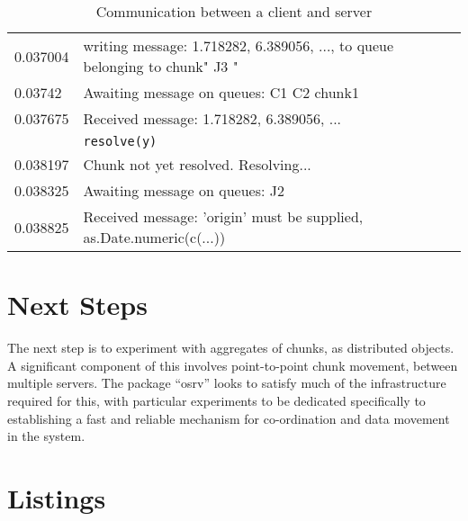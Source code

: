 \documentclass[a4paper,10pt]{article}
\begin{document}
\begin{table}
\begin{tabularx}{\textwidth}{lX}
		0.037004 & \textcolor{\servercolour}{writing message: 1.718282, 6.389056, ..., to queue belonging to chunk" J3 "} \\
		0.03742  & \textcolor{\servercolour}{Awaiting message on queues: C1     C2     chunk1} \\
		0.037675 & \textcolor{\clientcolour}{Received message: 1.718282, 6.389056, ... } \\
			 & \textcolor{\clientcolour}{\texttt{resolve(y)}} \\
		0.038197 & \textcolor{\clientcolour}{Chunk not yet resolved. Resolving...} \\
		0.038325 & \textcolor{\clientcolour}{Awaiting message on queues: J2} \\
		0.038825 & \textcolor{\clientcolour}{Received message: 'origin' must be supplied, as.Date.numeric(c(...))} \\
		\bottomrule
	\end{tabularx}
	\caption{Communication between a client and server}
	\label{tab:chunk-comm}
\end{table}

\section{Next Steps}

The next step is to experiment with aggregates of chunks, as distributed objects.
A significant component of this involves point-to-point chunk movement, between multiple servers.
The package ``osrv'' looks to satisfy much of the infrastructure required for
this, with particular experiments to be dedicated specifically to establishing
a fast and reliable mechanism for co-ordination and data movement in the system.

\section{Listings}\label{sec:listings}

\newpage








\end{document}
